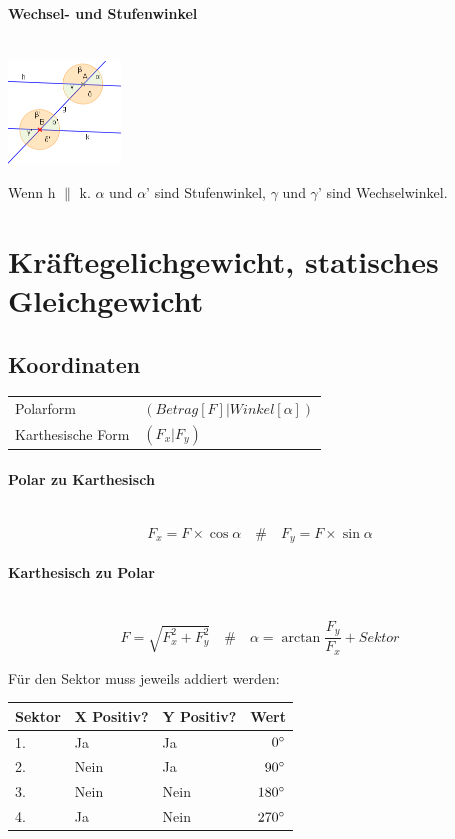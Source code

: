 \documentclass[a4paper,twoside,10pt]{article}
\newcommand{\lbparagraph}[1]{\paragraph{#1}\mbox{}\\}
\newcommand{\eqsp}[1]{\quad\#\quad}
\begin{document}
\lbparagraph{Wechsel- und Stufenwinkel}

\includegraphics[height=103px,keepaspectratio]{stufen-wechselwinkel}

Wenn h $\parallel$ k. $\alpha$ und $\alpha$' sind Stufenwinkel, $\gamma$ und $\gamma$' sind Wechselwinkel.

%

\section{Kräftegelichgewicht, statisches Gleichgewicht}

\subsection{Koordinaten}

\begin{tabular}{l l}
    Polarform & $(Betrag[F]|Winkel[\alpha])$ \\
    Karthesische Form & $(F_x|F_y)$
\end{tabular}

\lbparagraph{Polar zu Karthesisch}

\begin{equation}
    F_x = F \times \cos{\alpha}
    \eqsp{}
    F_y = F \times \sin{\alpha}
\end{equation}

\lbparagraph{Karthesisch zu Polar}

\begin{equation}
    F = \sqrt{F_x^2 + F_y^2}
    \eqsp{}
    \alpha = \arctan{\frac{F_y}{F_x}} + Sektor
\end{equation}

Für den Sektor muss jeweils addiert werden:

\begin{tabular}{l|l|l|r}
    Sektor & X Positiv? & Y Positiv? & Wert \\
    \hline
    1. & Ja & Ja & $0\degree$ \\
    2. & Nein & Ja & $90\degree$ \\
    3. & Nein & Nein & $180\degree$ \\
    4. & Ja & Nein & $270\degree$
\end{tabular}
\end{document}
